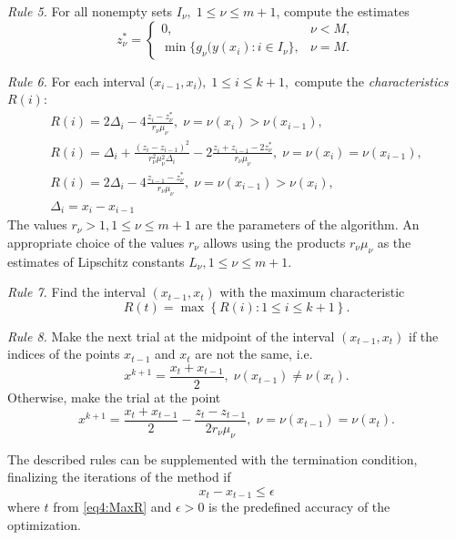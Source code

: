 \documentclass[graybox]{svmult}
\begin{document}
\emph{Rule 5.} For all nonempty sets $I_\nu, \; 1 \leq \nu \leq m+1$, compute the estimates
\begin{equation}
  \label{eq4:z_const}
  z_\nu^\ast = \left\{
  \begin{array}{lr}
    0, & \nu < M,\\
    \min\{ g_\nu(y(x_i): i\in I_\nu \}, & \nu = M.
  \end{array}
  \right.
\end{equation}

\emph{Rule 6.} For each interval ($x_{i-1},x_i), \; 1 \leq i \leq k+1,$ compute the \textit{characteristics} $R(i)$:
\begin{gather}
  \label{eq4:characteristic}
  R(i)=2\Delta_i-4\frac{z_i-z_\nu^\ast}{r_\nu \mu_\nu}, \; \nu=\nu(x_i)>\nu(x_{i-1}), \nonumber \\
  R(i)=\Delta_i+\frac{(z_i-z_{i-1})^2}{r_\nu^2 \mu_\nu^2\Delta_i}-2\frac{z_i+z_{i-1}-2z_\nu^\ast}{r_\nu \mu_\nu}, \;  \nu=\nu(x_i)=\nu(x_{i-1}),\\
  R(i)=2\Delta_i-4\frac{z_{i-1}-z_\nu^\ast}{r_\nu \mu_\nu}, \; \nu=\nu(x_{i-1})>\nu(x_i), \nonumber \\
  \Delta_i=x_i - x_{i-1} \nonumber
\end{gather}
The values $r_\nu>1, 1\le\nu\le m+1$ are the parameters of the algorithm. An appropriate choice of the values $r_\nu$ allows using the products $r_\nu\mu_\nu$ as the estimates of Lipschitz constants $L_\nu, 1\le\nu\le m+1$.

\emph{Rule 7.} Find the interval $(x_{t-1},x_t)$ with the maximum characteristic
\begin{equation}
\label{eq4:MaxR}
R(t)=\max{\left\{R(i): 1 \leq i \leq k+1\right\}}.
\end{equation}

\emph{Rule 8.} Make the next trial at the midpoint of the interval
$(x_{t-1},x_t)$ if the indices of the points $x_{t-1}$ and $x_t$  are not the same, i.e.
\[
x^{k+1} = \frac{x_t + x_{t-1}}{2}, \; \nu(x_{t-1}) \neq \nu(x_t).
\]
Otherwise, make the trial at the point
\begin{equation}
\label{eq4:next_point}
x^{k+1} = \frac{x_t+x_{t-1}}{2} - \frac{z_t-z_{t-1}}{2r_\nu\mu_\nu},\; \nu=\nu(x_{t-1})=\nu(x_t).
\end{equation}

The described rules can be supplemented with the termination condition, finalizing the iterations of the method if
\begin{equation}
\label{eq4:stop_cond}
  x_t - x_{t-1}\le\epsilon
\end{equation}
where $t$ from \eqref{eq4:MaxR} and $\epsilon>0$ is the predefined accuracy of the optimization.
\end{document}
